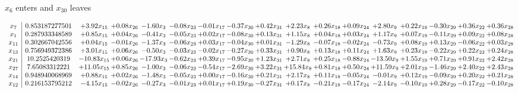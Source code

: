 \documentclass[9pt]{article}
\begin{document}
 $ x_{6} $ enters and $ x_{30} $ leaves 

 \[\begin{array}{c| c c@{\hskip 2pt} c@{\hskip 2pt} c@{\hskip 2pt} c@{\hskip 2pt} c@{\hskip 2pt} c@{\hskip 2pt} c@{\hskip 2pt} c@{\hskip 2pt} c@{\hskip 2pt} c@{\hskip 2pt} c@{\hskip 2pt} c@{\hskip 2pt} c@{\hskip 2pt} c@{\hskip 2pt} c@{\hskip 2pt} }
 x_{7}   &  0.853187277501 & +  3.92 x_{15} & +  0.08 x_{26} & -1.60 x_{3} & -0.08 x_{23} & -0.01 x_{17} & -0.37 x_{30} & +  0.42 x_{31} & +  2.23 x_{8} & +  0.26 x_{18} & +  0.09 x_{24} & +  2.80 x_{9} & +  0.22 x_{19} & -0.30 x_{29} & +  0.36 x_{22} & +  0.36 x_{28}\\
 x_{1}   &  0.287933348589 & +  0.85 x_{15} & +  0.04 x_{26} & -0.41 x_{3} & -0.05 x_{23} & +  0.02 x_{17} & -0.08 x_{30} & +  0.13 x_{31} & +  1.15 x_{8} & +  0.04 x_{18} & +  0.03 x_{24} & +  1.17 x_{9} & +  0.07 x_{19} & -0.11 x_{29} & +  0.09 x_{22} & +  0.08 x_{28}\\
 x_{11}   &  0.302667042556 & +  0.04 x_{15} & -0.01 x_{26} & -1.37 x_{3} & -0.06 x_{23} & +  0.03 x_{17} & -0.04 x_{30} & +  0.01 x_{31} & -1.29 x_{8} & -0.07 x_{18} & -0.02 x_{24} & -0.73 x_{9} & +  0.08 x_{19} & +  0.13 x_{29} & -0.06 x_{22} & +  0.03 x_{28}\\
 x_{13}   &  0.756949372386 & +  3.01 x_{15} & +  0.06 x_{26} & -0.50 x_{3} & -0.03 x_{23} & -0.02 x_{17} & -0.27 x_{30} & +  0.33 x_{31} & +  0.90 x_{8} & +  0.13 x_{18} & +  0.11 x_{24} & +  1.63 x_{9} & +  0.23 x_{19} & -0.22 x_{29} & +  0.22 x_{22} & +  0.24 x_{28}\\
 x_{21}   &  10.2525420319 & -10.83 x_{15} & +  0.06 x_{26} & -17.93 x_{3} & -0.62 x_{23} & +  0.39 x_{17} & -0.95 x_{30} & +  1.23 x_{31} & +  2.71 x_{8} & +  0.25 x_{18} & -0.88 x_{24} & -13.50 x_{9} & +  1.55 x_{19} & +  0.71 x_{29} & +  0.91 x_{22} & +  2.42 x_{28}\\
 x_{27}   &  7.65083312221 & + 11.05 x_{15} & +  0.85 x_{26} & -1.00 x_{3} & -0.06 x_{23} & -0.54 x_{17} & -2.69 x_{30} & +  3.22 x_{31} & + 15.84 x_{8} & +  0.81 x_{18} & +  0.50 x_{24} & + 11.59 x_{9} & +  2.01 x_{19} & -1.46 x_{29} & +  2.40 x_{22} & +  2.43 x_{28}\\
 x_{14}   &  0.948940068969 & +  0.88 x_{15} & +  0.02 x_{26} & -1.48 x_{3} & -0.05 x_{23} & +  0.00 x_{17} & -0.16 x_{30} & +  0.21 x_{31} & +  2.17 x_{8} & +  0.11 x_{18} & -0.05 x_{24} & -0.01 x_{9} & +  0.12 x_{19} & -0.09 x_{29} & +  0.20 x_{22} & +  0.21 x_{28}\\
 x_{12}   &  0.216153795212 & -4.15 x_{15} & -0.02 x_{26} & -0.27 x_{3} & -0.01 x_{23} & +  0.01 x_{17} & +  0.19 x_{30} & -0.27 x_{31} & +  0.17 x_{8} & -0.21 x_{18} & -0.17 x_{24} & -2.14 x_{9} & -0.10 x_{19} & +  0.28 x_{29} & -0.17 x_{22} & -0.10 x_{28}\\

\end{array}\]
\end{document}
